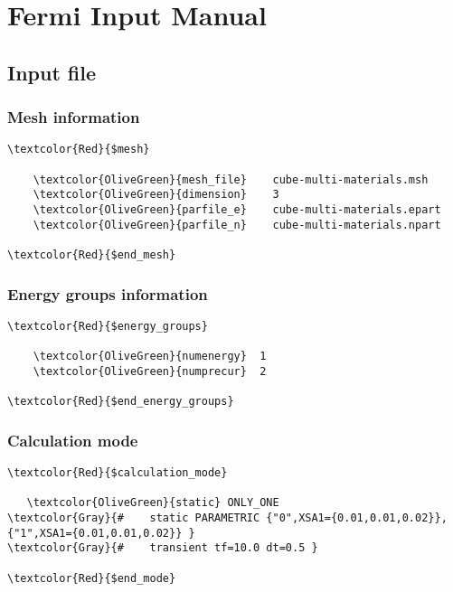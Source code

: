 \chapter*{Fermi Input Manual}




\section{Input file}

\subsection{Mesh information}

\begin{Verbatim}[frame=single,commandchars=\\\{\}]
\textcolor{Red}{$mesh}

    \textcolor{OliveGreen}{mesh_file}    cube-multi-materials.msh
    \textcolor{OliveGreen}{dimension}    3
    \textcolor{OliveGreen}{parfile_e}    cube-multi-materials.epart
    \textcolor{OliveGreen}{parfile_n}    cube-multi-materials.npart

\textcolor{Red}{$end_mesh} 
\end{Verbatim}

\subsection{Energy groups information}

\begin{Verbatim}[frame=single,commandchars=\\\{\}]
\textcolor{Red}{$energy_groups}

    \textcolor{OliveGreen}{numenergy}  1
    \textcolor{OliveGreen}{numprecur}  2
    
\textcolor{Red}{$end_energy_groups}
\end{Verbatim}

\subsection{Calculation mode}

\begin{Verbatim}[frame=single,commandchars=\\\{\}]
\textcolor{Red}{$calculation_mode}

   \textcolor{OliveGreen}{static} ONLY_ONE 
\textcolor{Gray}{#    static PARAMETRIC {"0",XSA1={0.01,0.01,0.02}}, {"1",XSA1={0.01,0.01,0.02}} }
\textcolor{Gray}{#    transient tf=10.0 dt=0.5 }

\textcolor{Red}{$end_mode}
\end{Verbatim}

